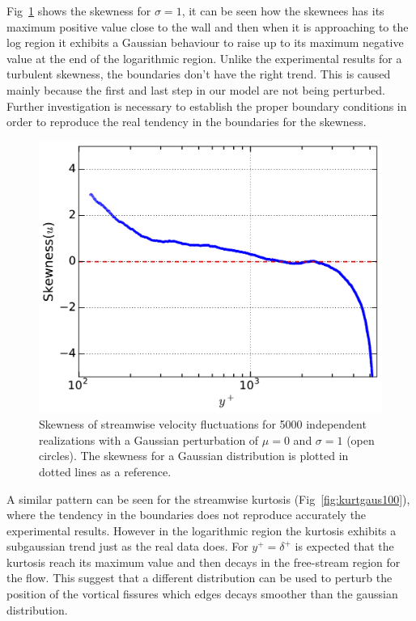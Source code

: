 \documentclass[aps,reprint,amsmath,amssymb,pra]{revtex4-1}%
\begin{document}
Fig~\ref{fig:skewgaus100} shows the skewness for $\sigma=1$, it can be seen how the skewnees has its maximum positive value close to the wall and then when it is approaching to the log region it exhibits a Gaussian behaviour to raise up to its maximum negative value at the end of the logarithmic region.  Unlike the experimental results for a turbulent skewness, the boundaries don't have the right trend. This is caused mainly because the first and last step in our model are not being perturbed. Further investigation is necessary to establish the proper boundary conditions in order to reproduce the real tendency in the boundaries for the skewness.
\begin{figure}[tb]
\includegraphics[scale=0.46]{figures/skewness_5000_assembles_gauss100}
\caption{\label{fig:skewgaus100} Skewness of streamwise velocity fluctuations for 5000 independent realizations with a Gaussian perturbation of $\mu=0$ and $\sigma=1$ (open circles). The skewness for a Gaussian distribution is plotted in dotted lines as a reference.}
\end{figure}
A similar pattern can be seen for the streamwise kurtosis (Fig~\ref{fig:kurtgaus100}), where the tendency in the boundaries does not reproduce accurately the experimental results. However in the logarithmic region the kurtosis exhibits a subgaussian trend just as the real data does. For $y^+=\delta^+$ is expected that the kurtosis reach its maximum value and
then decays in the free-stream region for the flow. This suggest that a different distribution can be used to perturb the position of the vortical fissures which edges decays smoother than the gaussian distribution. 
\end{document}
